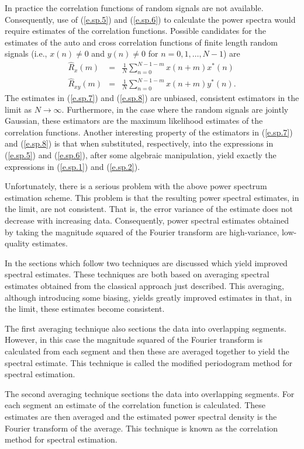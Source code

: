 	In practice the correlation functions of random signals
are not available.  Consequently, use of 
(\ref{e.sp.5}) and (\ref{e.sp.6}) to calculate the power spectra
would require estimates of the correlation functions.
Possible candidates for the estimates of the auto and cross
correlation functions of finite length random signals
(i.e., $x(n)\ne0$ and $y(n)\ne0$ for $n=0,1,\ldots,N-1$) are
%
\begin{eqnarray}
\hat{R}_x(m)&=&\frac{1}{N}\sum_{n=0}^{N-1-m}x(n+m)x^*(n)
\label{e.sp.7}\\
\hat{R}_{xy}(m)&=&\frac{1}{N}\sum_{n=0}^{N-1-m}x(n+m)y^*(n).
\label{e.sp.8}
\end{eqnarray}
%
The estimates in (\ref{e.sp.7}) and (\ref{e.sp.8}) are unbiased, 
consistent estimators in the limit as $N\rightarrow\infty$.  
Furthermore, in the 
case where the random signals are jointly Gaussian, these
estimators are the maximum likelihood estimates of the correlation
functions.  Another interesting property of 
the estimators in (\ref{e.sp.7}) and (\ref{e.sp.8}) is that
when substituted, respectively, into the expressions in 
(\ref{e.sp.5}) and (\ref{e.sp.6}), after some algebraic
manipulation, yield exactly the expressions in (\ref{e.sp.1})
and (\ref{e.sp.2}).

	Unfortunately, there is a serious problem with the 
above power spectrum estimation scheme.  This problem is that the 
resulting power spectral estimates, in the limit, are
not consistent.  That is, the error variance
of the estimate does not decrease with increasing data.
Consequently, power spectral estimates obtained
by taking the magnitude squared of the Fourier transform
are high-variance, low-quality estimates.

	In the sections which follow two
techniques are discussed which yield improved
spectral estimates.  These techniques are both based on averaging
spectral estimates obtained
from the classical approach just described.  This
averaging, although introducing some biasing,
yields greatly improved estimates in that, in the
limit, these estimates become consistent.

	The first averaging technique also sections
the data into overlapping segments.  However, in this
case the magnitude squared of the Fourier
transform is calculated from each segment and then these
are averaged together to yield the spectral estimate.
This technique is called the modified periodogram
method for spectral estimation.

	The second averaging technique sections the data
into overlapping segments.  For each segment an estimate of
the correlation function is calculated.  These estimates are
then averaged and the estimated power spectral density
is the Fourier transform of the average.  This technique is known
as the correlation method for spectral estimation.


